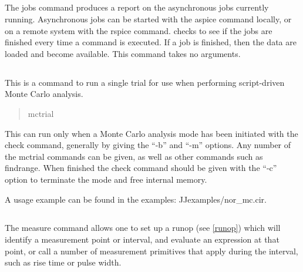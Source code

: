 \subsection{}


The {\cb jobs} command produces a report on the asynchronous
{\WRspice} jobs currently running.  Asynchronous jobs can be started
with the {\cb aspice} command locally, or on a remote system with the
{\cb rspice} command.  {\WRspice} checks to see if the jobs are
finished every time a command is executed.  If a job is finished, then
the data are loaded and become available.  This command takes no
arguments.

\subsection{}


This is a command to run a single trial for use when performing
script-driven Monte Carlo analysis.
\begin{quote}\vt
mctrial
\end{quote}

This can run only when a Monte Carlo analysis mode has been initiated
with the {\cb check} command, generally by giving the ``{\vt -b}'' and
``{\vt -m}'' options.  Any number of the {\cb mctrial} commands can be
given, as well as other commands such as {\cb findrange}.  When
finished the {\cb check} command should be given with the ``{\vt -c}''
option to terminate the mode and free internal memory.

A usage example can be found in the examples:  {\vt
JJexamples/nor\_mc.cir}.

\subsection{}


The {\cb measure} command allows one to set up a runop (see
\ref{runop}) which will identify a measurement point or interval, and
evaluate an expression at that point, or call a number of measurement
primitives that apply during the interval, such as rise time or pulse
width.

